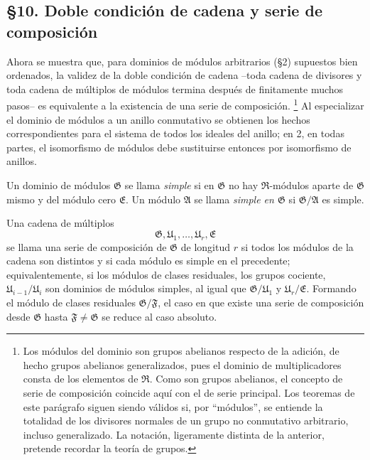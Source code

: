 \documentclass[11pt]{article}
\providecommand{\mR}{\mathfrak{R}}
\providecommand{\mA}{\mathfrak{A}}
\providecommand{\mE}{\mathfrak{E}}
\providecommand{\mF}{\mathfrak{F}}
\providecommand{\mG}{\mathfrak{G}}
\providecommand{\mU}{\mathfrak{U}}
\begin{document}
\subsection*{§10. Doble condición de cadena y serie de composición}

Ahora se muestra que, para dominios de módulos arbitrarios (§2) supuestos bien ordenados, la validez de la doble condición de cadena --toda cadena de divisores y toda cadena de múltiplos de módulos termina después de finitamente muchos pasos-- es equivalente a la existencia de una serie de composición.
\footnote{Los módulos del dominio son grupos abelianos respecto de la adición, de hecho grupos abelianos generalizados, pues el dominio de multiplicadores consta de los elementos de $\mR$. Como son grupos abelianos, el concepto de serie de composición coincide aquí con el de serie principal. Los teoremas de este parágrafo siguen siendo válidos si, por ``módulos'', se entiende la totalidad de los divisores normales de un grupo no conmutativo arbitrario, incluso generalizado. La notación, ligeramente distinta de la anterior, pretende recordar la teoría de grupos.}
Al especializar el dominio de módulos a un anillo conmutativo se obtienen los hechos correspondientes para el sistema de todos los ideales del anillo; en 2, en todas partes, el isomorfismo de módulos debe sustituirse entonces por isomorfismo de anillos.

Un dominio de módulos $\mG$ se llama \emph{simple} si en $\mG$ no hay $\mR$-módulos aparte de $\mG$ mismo y del módulo cero $\mE$. Un módulo $\mA$ se llama \emph{simple en $\mG$} si $\mG/\mA$ es simple.

Una cadena de múltiplos
\[
        \mG,\mU_1,\ldots,\mU_r,\mE
\]
se llama una serie de composición de $\mG$ de longitud $r$ si todos los módulos de la cadena son distintos y si cada módulo es simple en el precedente; equivalentemente, si los módulos de clases residuales, los grupos cociente, $\mU_{i-1}/\mU_i$ son dominios de módulos simples, al igual que $\mG/\mU_1$ y $\mU_r/\mE$. Formando el módulo de clases residuales $\mG/\mF$, el caso en que existe una serie de composición desde $\mG$ hasta $\mF\ne\mG$ se reduce al caso absoluto.
\end{document}
